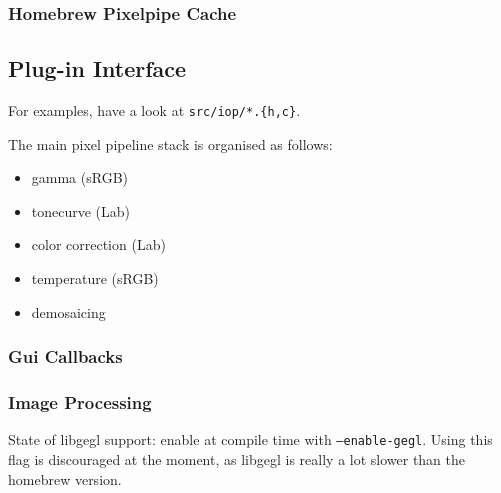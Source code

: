\documentclass[a4paper,twoside]{scrartcl}
\newcommand{\code}[1]{\texttt{\color{codecol}#1}}
\begin{document}
\subsubsection{Homebrew Pixelpipe Cache}

\subsection{Plug-in Interface}

For examples, have a look at \code{src/iop/*.\{h,c\}}.

The main pixel pipeline stack is organised as follows:

\begin{itemize}
  \item gamma (sRGB)
  \item tonecurve (Lab)
  \item color correction (Lab)
  \item temperature (sRGB)
  \item demosaicing
\end{itemize}

\subsubsection{Gui Callbacks}

\subsubsection{Image Processing}

State of libgegl support: enable at compile time with \texttt{--enable-gegl}. Using this
flag is discouraged at the moment, as libgegl is really a lot slower than the homebrew version.
\end{document}
